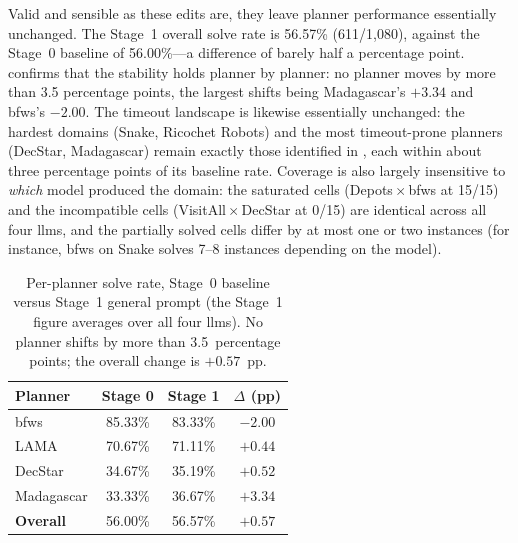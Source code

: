 Valid and sensible as these edits are, they leave planner performance essentially unchanged.
The Stage~1 overall solve rate is 56.57\% (611/1{,}080), against the Stage~0 baseline of 56.00\%---a difference of barely half a percentage point.
 confirms that the stability holds planner by planner: no planner moves by more than 3.5 percentage points, the largest shifts being Madagascar's $+3.34$ and \gls{bfws}'s $-2.00$.
The timeout landscape is likewise essentially unchanged: the hardest domains (Snake, Ricochet Robots) and the most timeout-prone planners (DecStar, Madagascar) remain exactly those identified in , each within about three percentage points of its baseline rate.
Coverage is also largely insensitive to \emph{which} model produced the domain: the saturated cells (Depots\,$\times$\,\gls{bfws} at 15/15) and the incompatible cells (VisitAll\,$\times$\,DecStar at 0/15) are identical across all four \glspl{llm}, and the partially solved cells differ by at most one or two instances (for instance, \gls{bfws} on Snake solves 7--8 instances depending on the model).

\begin{table}[htbp]
  \centering
  \caption{Per-planner solve rate, Stage~0 baseline versus Stage~1 general prompt (the Stage~1 figure averages over all four \glspl{llm}). No planner shifts by more than 3.5~percentage points; the overall change is $+0.57$~pp.}
  \label{tab:s1_solve_rate}
  \small
  \begin{tabular}{l c c c}
    \toprule
    \textbf{Planner} & \textbf{Stage 0} & \textbf{Stage 1} & \textbf{$\Delta$ (pp)} \\
    \midrule
    \gls{bfws}  & 85.33\% & 83.33\% & $-2.00$ \\
    LAMA  & 70.67\% & 71.11\% & $+0.44$ \\
    DecStar     & 34.67\% & 35.19\% & $+0.52$ \\
    Madagascar  & 33.33\% & 36.67\% & $+3.34$ \\
    \midrule
    \textbf{Overall} & 56.00\% & 56.57\% & $+0.57$ \\
    \bottomrule
  \end{tabular}
\end{table}

